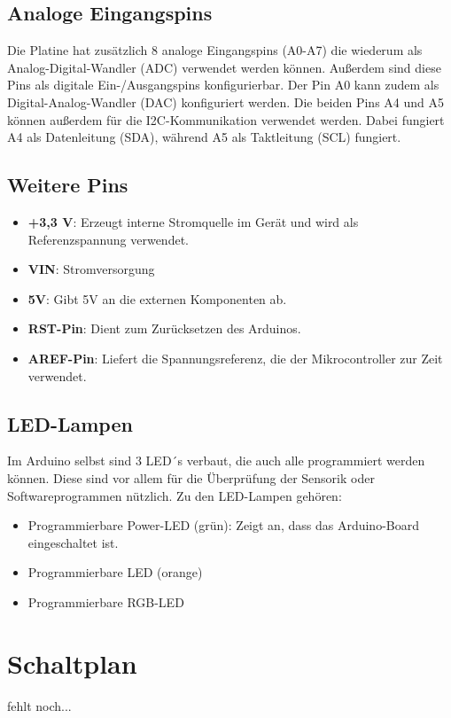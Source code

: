 \subsection{Analoge Eingangspins}
Die Platine hat zusätzlich 8 analoge Eingangspins (A0-A7) die wiederum als Analog-Digital-Wandler (ADC) verwendet werden können. Außerdem sind diese Pins als digitale Ein-/Ausgangspins konfigurierbar. Der Pin A0 kann zudem als Digital-Analog-Wandler (DAC) konfiguriert werden. Die beiden Pins A4 und A5 können außerdem für die I2C-Kommunikation verwendet werden. Dabei fungiert A4 als Datenleitung (SDA), während A5 als Taktleitung (SCL) fungiert.\cite{Ard.2024}

\subsection{Weitere Pins}
\begin{itemize}
	\item \textbf{+3,3 V}: Erzeugt interne Stromquelle im Gerät und wird als Referenzspannung verwendet.
	\item \textbf{VIN}: Stromversorgung
	\item \textbf{5V}: Gibt 5V an die externen Komponenten ab. 
	\item \textbf{RST-Pin}: Dient zum Zurücksetzen des Arduinos.
	\item \textbf{AREF-Pin}: Liefert die Spannungsreferenz, die der Mikrocontroller zur Zeit verwendet.
	\\ \cite{Ard.2024}
\end{itemize}

\subsection{LED-Lampen}
Im Arduino selbst sind 3 LED´s verbaut, die auch alle programmiert werden können. Diese sind vor allem für die Überprüfung der Sensorik oder Softwareprogrammen nützlich. Zu den LED-Lampen gehören: 
\begin{itemize}
	\item Programmierbare Power-LED (grün): Zeigt an, dass das Arduino-Board eingeschaltet ist.
	\item Programmierbare LED (orange)
	\item Programmierbare RGB-LED
	\\ \cite{Ard.2024}
\end{itemize}

\section{Schaltplan}
fehlt noch...

